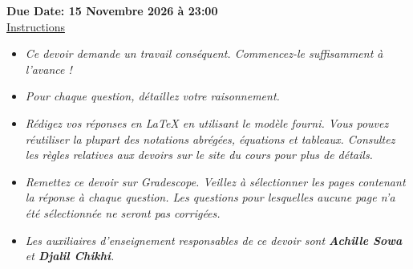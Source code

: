 \documentclass[12pt]{article}
\theoremstyle{definition}
\begin{document}
\fancyhead{}
\fancyfoot{}


\vspace{1cm}

\shorthandoff{:}
{\textbf{Due Date: 15 Novembre 2026 à 23:00 }}\\


\vspace{-0.5cm}
\underline{Instructions}%
\renewcommand{\labelitemi}{\textbullet}

\renewcommand{\labelitemi}{\textbullet}

\begin{itemize}

\item \emph{Ce devoir demande un travail conséquent. Commencez-le suffisamment à l'avance !}
\item \emph{Pour chaque question, détaillez votre raisonnement.}
\item \emph{Rédigez vos réponses en LaTeX en utilisant le modèle fourni. Vous pouvez réutiliser la plupart des notations abrégées, équations et tableaux. Consultez les règles relatives aux devoirs sur le site du cours pour plus de détails.}
\item \emph{Remettez ce devoir sur Gradescope. Veillez à sélectionner les pages contenant la réponse à chaque question. Les questions pour lesquelles aucune page n'a été sélectionnée ne seront pas corrigées.}
\item \emph{Les auxiliaires d'enseignement responsables de ce devoir sont \textbf{Achille Sowa} et \textbf{Djalil Chikhi}.}
\end{itemize}
\vspace{0.2cm}


\vspace{0.2cm}




\end{document}
